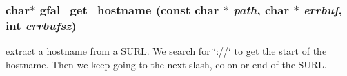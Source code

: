 \subsubsection{\setlength{\rightskip}{0pt plus 5cm}char$\ast$ gfal\_\-get\_\-hostname (const char $\ast$ {\em path}, char $\ast$ {\em errbuf}, int {\em errbufsz})}\label{group__internal__group_gfbe1d2da151f9bd6a0ab1ec1abf0ac81}


extract a hostname from a SURL. We search for \char`\"{}://\char`\"{} to get the start of the hostname. Then we keep going to the next slash, colon or end of the SURL. 